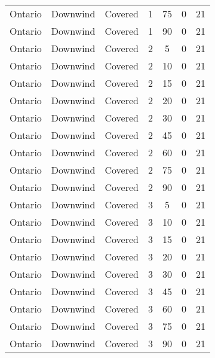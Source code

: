 \documentclass{article}
\begin{document}
\begin{longtable}[c]{ccccccc}
Ontario   & Downwind  & Covered     & 1               & 75           & 0           & 21  \\
Ontario   & Downwind  & Covered     & 1               & 90           & 0           & 21  \\
Ontario   & Downwind  & Covered     & 2               & 5            & 0           & 21  \\
Ontario   & Downwind  & Covered     & 2               & 10           & 0           & 21  \\
Ontario   & Downwind  & Covered     & 2               & 15           & 0           & 21  \\
Ontario   & Downwind  & Covered     & 2               & 20           & 0           & 21  \\
Ontario   & Downwind  & Covered     & 2               & 30           & 0           & 21  \\
Ontario   & Downwind  & Covered     & 2               & 45           & 0           & 21  \\
Ontario   & Downwind  & Covered     & 2               & 60           & 0           & 21  \\
Ontario   & Downwind  & Covered     & 2               & 75           & 0           & 21  \\
Ontario   & Downwind  & Covered     & 2               & 90           & 0           & 21  \\
Ontario   & Downwind  & Covered     & 3               & 5            & 0           & 21  \\
Ontario   & Downwind  & Covered     & 3               & 10           & 0           & 21  \\
Ontario   & Downwind  & Covered     & 3               & 15           & 0           & 21  \\
Ontario   & Downwind  & Covered     & 3               & 20           & 0           & 21  \\
Ontario   & Downwind  & Covered     & 3               & 30           & 0           & 21  \\
Ontario   & Downwind  & Covered     & 3               & 45           & 0           & 21  \\
Ontario   & Downwind  & Covered     & 3               & 60           & 0           & 21  \\
Ontario   & Downwind  & Covered     & 3               & 75           & 0           & 21  \\
Ontario   & Downwind  & Covered     & 3               & 90           & 0           & 21  \\

\end{longtable}
\end{document}
